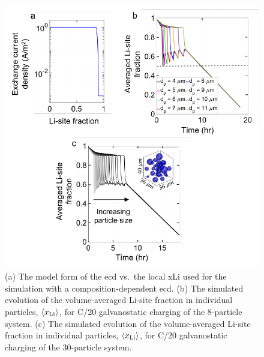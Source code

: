 \documentclass{WileyMSP-template}
\begin{document}
\newpage
\begin{figure}[!h]
  \includegraphics[scale =1]{figures/modeling_figure_1.pdf}
  \caption{(a) The model form of the \gls{ecd} vs.\ the
    local \gls{xLi} used for the simulation with a
    composition-dependent \gls{ecd}. (b) The simulated evolution of
    the volume-averaged Li-site fraction in individual particles,
    $\left\langle x_{\rm{Li}}\right\rangle $, for C/20 galvanostatic
    charging of the 8-particle system. (c) The simulated evolution of
    the volume-averaged Li-site fraction in individual particles,
    $\left\langle x_{\rm{Li}}\right\rangle $, for C/20 galvanostatic
    charging of the 30-particle system.}
  \label{fig:model-1}
\end{figure}
\end{document}
